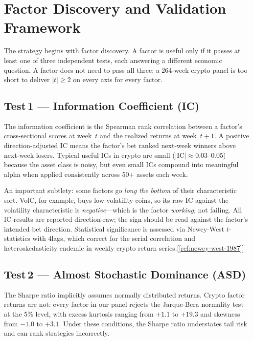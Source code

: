 \documentclass[11pt,a4paper]{article}
\newcommand{\ieeecite}[1]{\hyperref[ref:#1]{[\ref*{ref:#1}]}}
\begin{document}
\section{Factor Discovery and Validation Framework}

The strategy begins with factor discovery. A factor is useful only if it passes at least one of three independent tests, each answering a different economic question. A factor does not need to pass all three: a 264-week crypto panel is too short to deliver $|t| \geq 2$ on every axis for every factor.

\subsection{Test\,1 --- Information Coefficient (IC)}

The information coefficient is the Spearman rank correlation between a factor's cross-sectional scores at week~$t$ and the realized returns at week~$t{+}1$. A positive direction-adjusted IC means the factor's bet ranked next-week winners above next-week losers. Typical useful ICs in crypto are small ($|\text{IC}| \approx 0.03$--$0.05$) because the asset class is noisy, but even small ICs compound into meaningful alpha when applied consistently across 50+ assets each week.

An important subtlety: some factors go \emph{long the bottom} of their characteristic sort. VolC, for example, buys low-volatility coins, so its raw IC against the volatility characteristic is \emph{negative}---which is the factor \emph{working}, not failing. All IC results are reported direction-raw; the sign should be read against the factor's intended bet direction. Statistical significance is assessed via Newey-West $t$-statistics with 4\;lags, which correct for the serial correlation and heteroskedasticity endemic in weekly crypto return series.\ieeecite{newey-west-1987}

\subsection{Test\,2 --- Almost Stochastic Dominance (ASD)}

The Sharpe ratio implicitly assumes normally distributed returns. Crypto factor returns are not: every factor in our panel rejects the Jarque-Bera normality test at the 5\% level, with excess kurtosis ranging from $+1.1$ to $+19.3$ and skewness from $-1.0$ to $+3.1$. Under these conditions, the Sharpe ratio understates tail risk and can rank strategies incorrectly.
\end{document}
